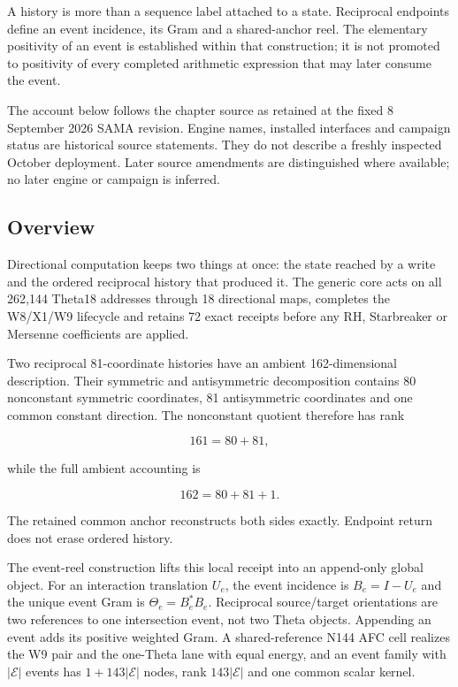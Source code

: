 \label{viii-ch06-directional-history-and-event-reels}

A history is more than a sequence label attached to a state. Reciprocal
endpoints define an event incidence, its Gram and a shared-anchor reel.
The elementary positivity of an event is established within that
construction; it is not promoted to positivity of every completed
arithmetic expression that may later consume the event.

The account below follows the chapter source as retained at the fixed 8
September 2026 SAMA revision. Engine names, installed interfaces and
campaign status are historical source statements. They do not describe a
freshly inspected October deployment. Later source amendments are
distinguished where available; no later engine or campaign is inferred.

\subsection{Overview}\label{viii-ch06-overview}

Directional computation keeps two things at once: the state reached by a
write and the ordered reciprocal history that produced it. The generic
core acts on all 262,144 Theta18 addresses through 18 directional maps,
completes the W8/X1/W9 lifecycle and retains 72 exact receipts before
any RH, Starbreaker or Mersenne coefficients are applied.

Two reciprocal 81-coordinate histories have an ambient 162-dimensional
description. Their symmetric and antisymmetric decomposition contains 80
nonconstant symmetric coordinates, 81 antisymmetric coordinates and one
common constant direction. The nonconstant quotient therefore has rank

\[
161=80+81,
\]

while the full ambient accounting is

\[
162=80+81+1.
\]

The retained common anchor reconstructs both sides exactly. Endpoint
return does not erase ordered history.

The event-reel construction lifts this local receipt into an append-only
global object. For an interaction translation \(U_e\), the event
incidence is \(B_e=I-U_e\) and the unique event Gram is
\(\Theta_e=B_e^*B_e\). Reciprocal source/target orientations are two
references to one intersection event, not two Theta objects. Appending
an event adds its positive weighted Gram. A shared-reference N144 AFC
cell realizes the W9 pair and the one-Theta lane with equal energy, and
an event family with \(|\mathcal E|\) events has \(1+143|\mathcal E|\)
nodes, rank \(143|\mathcal E|\) and one common scalar kernel.

